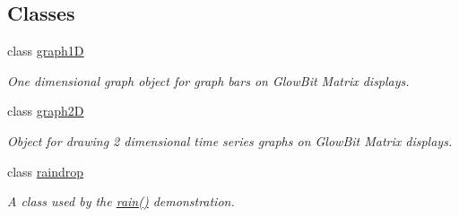 \subsection*{Classes}
\begin{DoxyCompactItemize}
\item 
class \hyperlink{classglowbit_1_1glowbitMatrix_1_1graph1D}{graph1D}
\begin{DoxyCompactList}\small\item\em One dimensional graph object for graph bars on Glow\+Bit Matrix displays. \end{DoxyCompactList}\item 
class \hyperlink{classglowbit_1_1glowbitMatrix_1_1graph2D}{graph2D}
\begin{DoxyCompactList}\small\item\em Object for drawing 2 dimensional time series graphs on Glow\+Bit Matrix displays. \end{DoxyCompactList}\item 
class \hyperlink{classglowbit_1_1glowbitMatrix_1_1raindrop}{raindrop}
\begin{DoxyCompactList}\small\item\em A class used by the \hyperlink{classglowbit_1_1glowbitMatrix_a088608e2586a76f09eb7312f2155f0b8}{rain()} demonstration. \end{DoxyCompactList}\end{DoxyCompactItemize}
